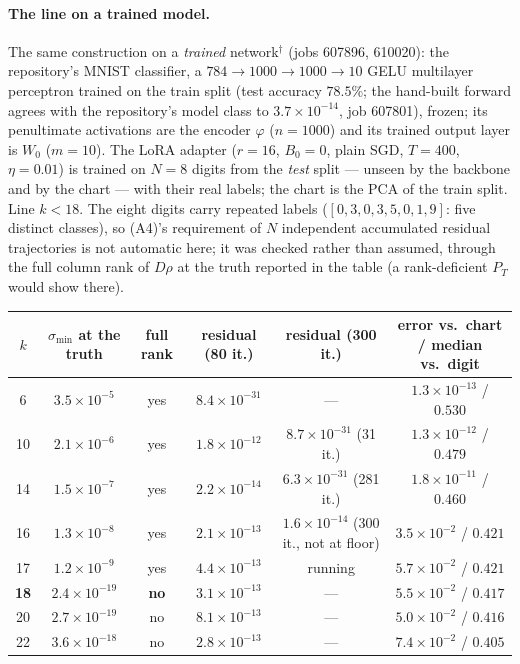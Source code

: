 \paragraph{The line on a trained model.} The same construction on a
\emph{trained} network$^\dagger$ (jobs 607896, 610020): the repository's
MNIST classifier, a $784\to1000\to1000\to10$ GELU multilayer perceptron
trained on the train split (test accuracy $78.5\%$; the hand-built forward
agrees with the repository's model class to $3.7\times10^{-14}$, job
607801), frozen; its penultimate activations are the encoder $\varphi$
($n=1000$) and its trained output layer is $W_0$ ($m=10$). The LoRA
adapter ($r=16$, $B_0=0$, plain SGD, $T=400$, $\eta=0.01$) is trained on
$N=8$ digits from the \emph{test} split — unseen by the backbone and by the
chart — with their real labels; the chart is the PCA of the train split.
Line $k<18$. The eight digits carry repeated labels
($[0,3,0,3,5,0,1,9]$: five distinct classes), so (A4)'s requirement of $N$
independent accumulated residual trajectories is not automatic here; it was
checked rather than assumed, through the full column rank of $D\rho$ at the
truth reported in the table (a rank-deficient $P_T$ would show there).
\begin{center}\small
\begin{tabular}{@{}cccccc@{}}\toprule
$k$ & $\sigma_{\min}$ at the truth & full rank & residual (80 it.) & residual (300 it.) & error vs.\ chart / median vs.\ digit\\ \midrule
6  & $3.5\times10^{-5}$ & yes & $8.4\times10^{-31}$ & — & $1.3\times10^{-13}$ / $0.530$\\
10 & $2.1\times10^{-6}$ & yes & $1.8\times10^{-12}$ & $8.7\times10^{-31}$ (31 it.) & $1.3\times10^{-12}$ / $0.479$\\
14 & $1.5\times10^{-7}$ & yes & $2.2\times10^{-14}$ & $6.3\times10^{-31}$ (281 it.) & $1.8\times10^{-11}$ / $0.460$\\
16 & $1.3\times10^{-8}$ & yes & $2.1\times10^{-13}$ & $1.6\times10^{-14}$ (300 it., not at floor) & $3.5\times10^{-2}$ / $0.421$\\
17 & $1.2\times10^{-9}$ & yes & $4.4\times10^{-13}$ & running & $5.7\times10^{-2}$ / $0.421$\\
\textbf{18} & $2.4\times10^{-19}$ & \textbf{no} & $3.1\times10^{-13}$ & — & $5.5\times10^{-2}$ / $0.417$\\
20 & $2.7\times10^{-19}$ & no & $8.1\times10^{-13}$ & — & $5.0\times10^{-2}$ / $0.416$\\
22 & $3.6\times10^{-18}$ & no & $2.8\times10^{-13}$ & — & $7.4\times10^{-2}$ / $0.405$\\ \bottomrule
\end{tabular}
\end{center}

